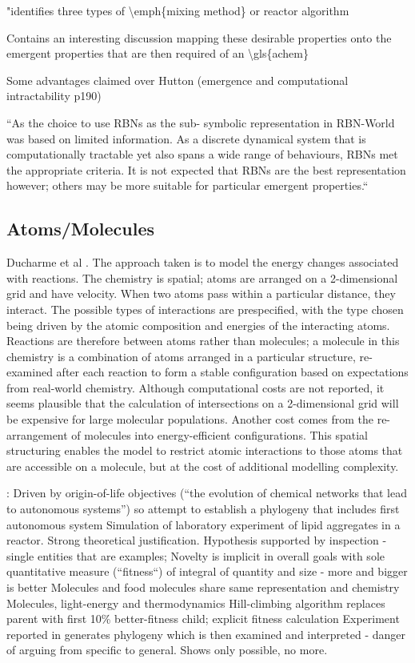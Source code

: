 "identifies three types of \textbackslash{}emph\{mixing method\} or reactor algorithm			

Contains an interesting discussion mapping these desirable properties onto the emergent properties that are then required of an \textbackslash{}gls\{achem\}

Some advantages claimed over Hutton (emergence and computational intractability p190)

``As the choice to use RBNs as the sub- symbolic representation in RBN-World was based on limited information. As a discrete dynamical system that is computationally tractable yet also spans a wide range of behaviours, RBNs met the appropriate criteria. It is not expected that RBNs are the best representation however; others may be more suitable for particular emergent properties.``

\subsection{Atoms/Molecules}

Ducharme et al \parencite{Ducharme2012}. The approach taken is to model the energy changes associated with reactions. The chemistry is spatial; atoms are arranged on a 2-dimensional grid and have velocity. When two atoms pass within a particular distance, they interact. The possible types of interactions are prespecified, with the type chosen being driven by the atomic composition and energies of the interacting atoms. Reactions are therefore between atoms rather than molecules; a molecule in this chemistry is a combination of atoms arranged in a particular structure, re-examined after each reaction to form a stable configuration based on expectations from real-world chemistry. Although computational costs are not reported, it seems plausible that the calculation of intersections on a 2-dimensional grid will be expensive for large molecular populations. Another cost comes from the re-arrangement of molecules into energy-efficient configurations. This spatial structuring enables the model to restrict atomic interactions to those atoms that are accessible on a molecule, but at the cost of additional modelling complexity. 

\cite{Fernando:2008xy,Fernando:2007pf}:
Driven by origin-of-life objectives (``the evolution of chemical networks that lead to autonomous systems'') so attempt to establish a phylogeny that includes first autonomous system
Simulation of laboratory experiment of lipid aggregates in a reactor. Strong theoretical justification. Hypothesis supported by inspection - single entities that are examples; Novelty is implicit in overall goals with sole quantitative measure (``fitness``) of integral of quantity and size - more and bigger is better
Molecules and food molecules share same representation and chemistry
Molecules, light-energy and thermodynamics
Hill-climbing algorithm replaces parent with first 10\% better-fitness child; explicit fitness calculation
Experiment reported in \textcite{Fernando:2008xy} generates phylogeny which is then examined and interpreted - danger of arguing from specific to general. Shows only possible, no more.

